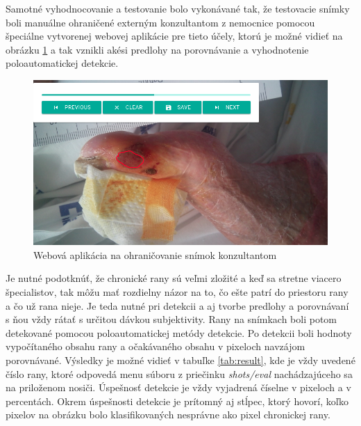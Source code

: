 Samotné vyhodnocovanie a testovanie bolo vykonávané tak, že testovacie snímky boli manuálne ohraničené externým konzultantom z nemocnice pomocou špeciálne vytvorenej webovej aplikácie pre tieto účely, ktorú je možné vidieť na obrázku \ref{fig:anotator} a tak vznikli akési predlohy na porovnávanie a vyhodnotenie poloautomatickej detekcie. 
\begin{figure}[h]
  \centering
  \includegraphics[scale=0.5]{fig/anotator.png}
  \caption{Webová aplikácia na ohraničovanie snímok konzultantom}
  \label{fig:anotator}
\end{figure}
Je nutné podotknúť, že chronické rany sú veľmi zložité a keď sa stretne viacero špecialistov, tak môžu mať rozdielny názor na to, čo ešte patrí do priestoru rany a čo už rana nieje. Je teda nutné pri detekcii a aj tvorbe predlohy a porovnávaní s ňou vždy rátať s určitou dávkou subjektivity. Rany na snímkach boli potom detekované pomocou poloautomatickej metódy detekcie. Po detekcii boli hodnoty vypočítaného obsahu rany a očakávaného obsahu v pixeloch navzájom porovnávané. Výsledky je možné vidieť v tabuľke \ref{tab:result}, kde je vždy uvedené číslo rany, ktoré odpovedá menu súboru z priečinku \textit{shots/eval} nachádzajúceho sa na priloženom nosiči. Úspešnosť detekcie je vždy vyjadrená číselne v pixeloch a v percentách. Okrem úspešnosti detekcie je prítomný aj stĺpec, ktorý hovorí, koľko pixelov na obrázku bolo klasifikovaných nesprávne ako pixel chronickej rany. 
